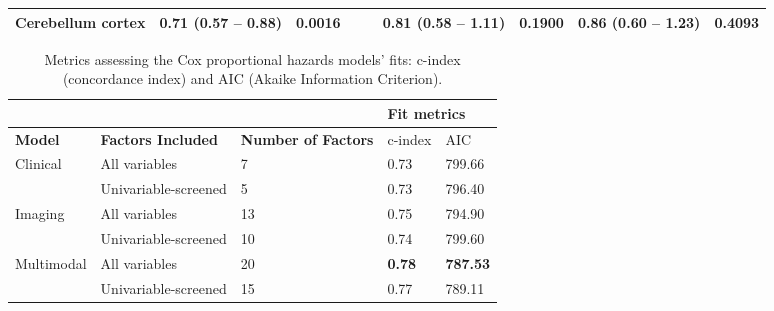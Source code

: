 \begin{sidewaystable}
{\begin{tabular}{|l|lr|lr|lr|lr|}
\hline
Cerebellum cortex & \textcolor[rgb]{0.2,0.2,0.2}{0.71 (0.57 -- 0.88)} & \textcolor[rgb]{0.2,0.2,0.2}{\textbf{0.0016}} & {\cellcolor[rgb]{0.753,0.753,0.753}} & {\cellcolor[rgb]{0.753,0.753,0.753}} & \textcolor[rgb]{0.2,0.2,0.2}{0.81 (0.58 -- 1.11)} & \textcolor[rgb]{0.2,0.2,0.2}{0.1900}\textcolor[rgb]{0.2,0.2,0.2}{} & \textcolor[rgb]{0.2,0.2,0.2}{0.86 (0.60 -- 1.23)} & \textcolor[rgb]{0.2,0.2,0.2}{0.4093} \\
\hline
\end{tabular}
}
\end{sidewaystable}



\begin{table}
\centering
\label{tab:coxfitmetrics}
\caption{Metrics assessing the Cox proportional hazards models' fits: c-index (concordance index) and AIC (Akaike Information Criterion).}
\begin{tabular}{|l|l|l|ll|} 
\cline{4-5}
\multicolumn{1}{l}{} & \multicolumn{1}{l}{} & & \multicolumn{2}{l|}{\textbf{Fit metrics} } \\ 
\hline
\textbf{Model} & \textbf{Factors Included} & \textbf{Number of Factors} & c-index & AIC \\ 
\hline
\multirow{2}{*}{Clinical} & All variables & 7 & 0.73 & 799.66 \\ 
\cline{2-5}
 & Univariable-screened & 5 & 0.73 & 796.40 \\ 
\hline
\multirow{2}{*}{Imaging} & All variables & 13 & 0.75 & 794.90 \\ 
\cline{2-5}
 & Univariable-screened & 10 & 0.74 & 799.60 \\ 
\hline
\multirow{2}{*}{Multimodal} & All variables & 20 & \textbf{0.78} & \textbf{787.53} \\ 
\cline{2-5}
 & Univariable-screened & 15 & 0.77 & 789.11 \\
\hline
\end{tabular}
\end{table}